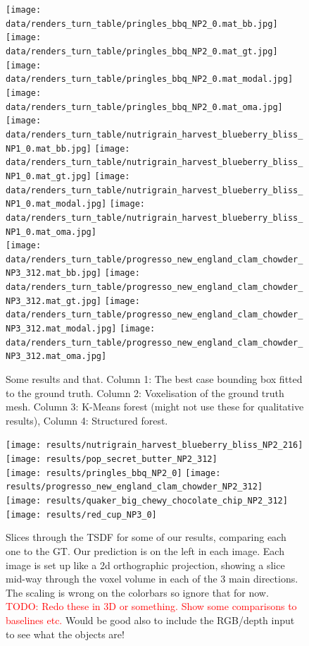 \documentclass[10pt,twocolumn,letterpaper]{article}
\newcommand{\todo}[1]{\textcolor{red}{TODO: #1}}
\begin{document}

\newcommand\objone[1]{%
}


\begin{figure}
     \texttt{[image: data/renders\_turn\_table/pringles\_bbq\_NP2\_0.mat\_bb.jpg]}
     \texttt{[image: data/renders\_turn\_table/pringles\_bbq\_NP2\_0.mat\_gt.jpg]}
     \texttt{[image: data/renders\_turn\_table/pringles\_bbq\_NP2\_0.mat\_modal.jpg]}
     \texttt{[image: data/renders\_turn\_table/pringles\_bbq\_NP2\_0.mat\_oma.jpg]} \\
    \texttt{[image: data/renders\_turn\_table/nutrigrain\_harvest\_blueberry\_bliss\_NP1\_0.mat\_bb.jpg]}
     \texttt{[image: data/renders\_turn\_table/nutrigrain\_harvest\_blueberry\_bliss\_NP1\_0.mat\_gt.jpg]}
     \texttt{[image: data/renders\_turn\_table/nutrigrain\_harvest\_blueberry\_bliss\_NP1\_0.mat\_modal.jpg]}
     \texttt{[image: data/renders\_turn\_table/nutrigrain\_harvest\_blueberry\_bliss\_NP1\_0.mat\_oma.jpg]} \\
      \texttt{[image: data/renders\_turn\_table/progresso\_new\_england\_clam\_chowder\_NP3\_312.mat\_bb.jpg]}
     \texttt{[image: data/renders\_turn\_table/progresso\_new\_england\_clam\_chowder\_NP3\_312.mat\_gt.jpg]}
     \texttt{[image: data/renders\_turn\_table/progresso\_new\_england\_clam\_chowder\_NP3\_312.mat\_modal.jpg]}
     \texttt{[image: data/renders\_turn\_table/progresso\_new\_england\_clam\_chowder\_NP3\_312.mat\_oma.jpg]} 
     \caption{Some results and that. Column 1: The best case bounding box fitted to the ground truth. Column 2: Voxelisation of the ground truth mesh. Column 3: K-Means forest (might not use these for qualitative results), Column 4: Structured forest.}
\end{figure}

\newcommand{\resultswidth}{0.41\columnwidth}
\begin{figure}
     \texttt{[image: results/nutrigrain\_harvest\_blueberry\_bliss\_NP2\_216]}
     \texttt{[image: results/pop\_secret\_butter\_NP2\_312]}\\
     \texttt{[image: results/pringles\_bbq\_NP2\_0]}
     \texttt{[image: results/progresso\_new\_england\_clam\_chowder\_NP2\_312]}\\
     \texttt{[image: results/quaker\_big\_chewy\_chocolate\_chip\_NP2\_312]}
     \texttt{[image: results/red\_cup\_NP3\_0]}
     \caption{Slices through the TSDF for some of our results, comparing each one to the GT. 
     Our prediction is on the left in each image.
     Each image is set up like a 2d orthographic projection, showing a slice mid-way through the voxel volume in each of the 3 main directions.
     The scaling is wrong on the colorbars so ignore that for now.
     \todo{Redo these in 3D or something. Show some comparisons to baselines etc.}
     Would be good also to include the RGB/depth input to see what the objects are!}
\end{figure}
\end{document}
